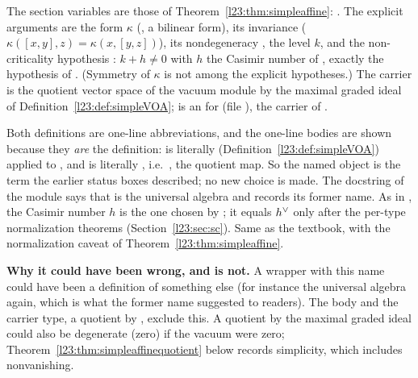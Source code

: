 \begin{dictionary}
The section variables are those of Theorem~\ref{l23:thm:simpleaffine}: . The explicit arguments are the form $\kappa$ (, a
bilinear form), its invariance  ($\kappa([x,y],z)=\kappa(x,[y,z])$), its nondegeneracy , the level $k$, and the
non-criticality hypothesis : $k+h\ne0$ with $h$ the Casimir number of , exactly the hypothesis of
. (Symmetry of $\kappa$ is not among the explicit hypotheses.) The carrier
 is the quotient vector space of the vacuum
module by the maximal graded ideal of Definition~\ref{l23:def:simpleVOA};  is an  for
 (file ), the carrier of
.

Both definitions are one-line abbreviations, and the one-line bodies are shown because they \emph{are} the definition:
 is literally  (Definition~\ref{l23:def:simpleVOA}) applied to , and
 is literally , i.e.\ , the quotient map. So the named object is
the term the earlier status boxes described; no new choice is made. The docstring of the module says that  is the universal algebra and records its former name. As in , the Casimir number $h$ is the one chosen
by ; it equals $h^\vee$ only after the per-type normalization theorems (Section~\ref{l23:sec:sc}).
Same as the textbook, with the normalization caveat of Theorem~\ref{l23:thm:simpleaffine}.
\end{dictionary}

\textbf{Why it could have been wrong, and is not.} A wrapper with this name could have been a definition of something else (for
instance the universal algebra again, which is what the former name  suggested to readers). The body  and
the carrier type, a quotient by , exclude this. A quotient by the maximal graded ideal could also be degenerate
(zero) if the vacuum were zero; Theorem~\ref{l23:thm:simpleaffinequotient} below records simplicity, which includes nonvanishing.

